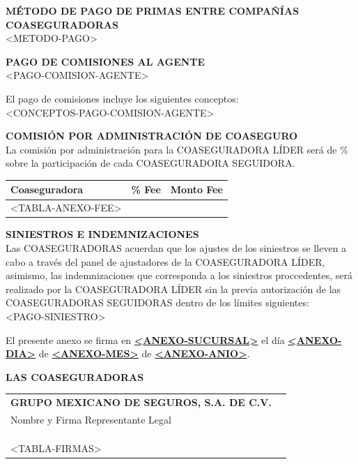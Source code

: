 ﻿\documentclass[letterpaper,10pt]{article}
\begin{document}
\newpage

\textbf{MÉTODO DE PAGO DE PRIMAS ENTRE COMPAÑÍAS COASEGURADORAS}\\

<METODO-PAGO>

\textbf{PAGO DE COMISIONES AL AGENTE}\\

<PAGO-COMISION-AGENTE>

El pago de comisiones incluye los siguientes conceptos:\\

<CONCEPTOS-PAGO-COMISION-AGENTE>

\textbf{COMISIÓN POR ADMINISTRACIÓN DE COASEGURO}\\

La comisión por administración para la COASEGURADORA LÍDER será de \underline{\hspace{2cm}}\% sobre la participación de cada COASEGURADORA SEGUIDORA.

\begin{center}
    \begin{tabularx}{\textwidth}{|X|c|r|}
        \hline
        \textbf{Coaseguradora} & \textbf{\% Fee} & \textbf{Monto Fee}\\\hline
        <TABLA-ANEXO-FEE>
    \end{tabularx}
\end{center}

\textbf{SINIESTROS E INDEMNIZACIONES}\\

Las COASEGURADORAS acuerdan que los ajustes de los siniestros se lleven a cabo a través del panel de ajustadores de la COASEGURADORA LÍDER, asimismo, las indemnizaciones que corresponda a los siniestros proccedentes, será realizado por la COASEGURADORA LÍDER sin la previa autorización de las COASEGURADORAS SEGUIDORAS dentro de los límites siguientes:\\

<PAGO-SINIESTRO>

\newpage

El presente anexo se firma en \underline{\textbf{<ANEXO-SUCURSAL>}} el día \underline{\textbf{<ANEXO-DIA>}} de \underline{\textbf{<ANEXO-MES>}} de \underline{\textbf{<ANEXO-ANIO>}}.\\

\begin{center}
    \textbf{LAS COASEGURADORAS}\\\vspace{1cm}
    
    \begin{tabularx}{\textwidth}{Xr}
        \textbf{GRUPO MEXICANO DE SEGUROS, S.A. DE C.V.} &\\
        Nombre y Firma Representante Legal & \underline{\hspace{5cm}}\\\\\\\\
        <TABLA-FIRMAS>
    \end{tabularx}
\end{center}
	
\end{document}
